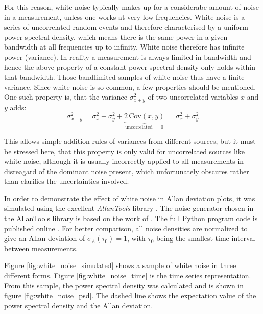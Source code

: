 For this reason, white noise typically makes up for a considerabe amount of noise in a measurement, unless one works at very low frequencies. White noise is a series of uncorrelated random events and therefore characterised by a uniform power spectral density, which means there is the same power in a given bandwidth at all frequencies up to infinity. White noise therefore has infinite power (variance). In reality a measurement is always limited in bandwidth and hence the above property of a constant power spectral density only holds within that bandwidth. Those bandlimited samples of white noise thus have a finite variance.
Since white noise is so common, a few properties should be mentioned. One such property is, that the variance $\sigma_{x+y}^2$ of two uncorrelated variables $x$ and $y$ adds:
\begin{equation}
    \sigma_{x+y}^2  = \sigma_x^2 + \sigma_y^2 + \underbrace{2\,\mathrm{Cov}(x,y)}_{\text{uncorrelated}\, =\, 0}\ = \sigma_x^2 + \sigma_y^2 \label{eqn:adding_white_noise}
\end{equation}

This allows simple addition rules of variances from different sources, but it must be stressed here, that this property is only valid for uncorrelated sources like white noise, although it is usually incorrectly applied to all measurements in disreagard of the dominant noise present, which unfortunately obscures rather than clarifies the uncertainties involved.

In order to demonstrate the effect of white noise in Allan deviation plots, it was simulated using the excellent \textit{AllanTools} library \cite{allantools}. The noise generator chosen in the AllanTools library is based on the work of \citeauthor{noise_generation} \cite{noise_generation}. The full Python program code is published online \cite{}. For better comparison, all noise densities are normalized to give an Allan deviation of $\sigma_A(\tau_0)=1$, with $\tau_0$ being the smallest time interval between measurements.

Figure \ref{fig:white_noise_simulated} shows a sample of white noise in three different forms. Figure \ref{fig:white_noise_time} is the time series representation. From this sample, the power spectral density was calculated and is shown in figure \ref{fig:white_noise_psd}. The dashed line shows the expectation value of the power spectral density and the Allan deviation.

